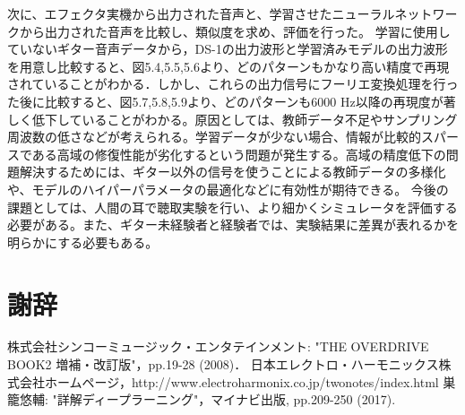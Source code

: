 \documentclass{jreport}		%
\begin{document}
次に、エフェクタ実機から出力された音声と、学習させたニューラルネットワークから出力された音声を比較し、類似度を求め、評価を行った。
学習に使用していないギター音声データから，DS-1の出力波形と学習済みモデルの出力波形を用意し比較すると、図5.4,5.5,5.6より、どのパターンもかなり高い精度で再現されていることがわかる．しかし、これらの出力信号にフーリエ変換処理を行った後に比較すると、図5.7,5.8,5.9より、どのパターンも6000 Hz以降の再現度が著しく低下していることがわかる。原因としては、教師データ不足やサンプリング周波数の低さなどが考えられる。学習データが少ない場合、情報が比較的スパースである高域の修復性能が劣化するという問題が発生する。高域の精度低下の問題解決するためには、ギター以外の信号を使うことによる教師データの多様化や、モデルのハイパーパラメータの最適化などに有効性が期待できる。
今後の課題としては、人間の耳で聴取実験を行い、より細かくシミュレータを評価する必要がある。また、ギター未経験者と経験者では、実験結果に差異が表れるかを明らかにする必要もある。

\chapter*{謝辞}

\begin{thebibliography}{3}
   株式会社シンコーミュージック・エンタテインメント: "THE OVERDRIVE BOOK2 増補・改訂版"，pp.19-28 (2008)．
   日本エレクトロ・ハーモニックス株式会社ホームページ，http://www.electroharmonix.co.jp/twonotes/index.html
   巣籠悠輔: "詳解ディープラーニング"，マイナビ出版, pp.209-250 (2017).
\end{thebibliography}
\end{document}
